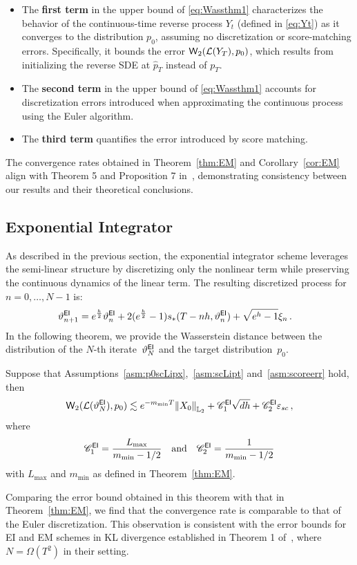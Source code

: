 \documentclass[11pt]{article}
\def\Ltwo{\mathbb L_2}
\def\wass{{\sf W}}
\def\law{{\mathcal L}}
\def\l|{\left\lVert}
\def\r|{\right\rVert}
\begin{document}
\begin{itemize}
    \item The \textbf{first term} in the upper bound of \eqref{eq:Wassthm1} characterizes the behavior of the continuous-time reverse process $Y_t$ (defined in \eqref{eq:Yt}) as it converges to the distribution $p_0$, assuming no discretization or score-matching errors. Specifically, it bounds the error $\wass_2(\law(Y_T), p_0)$, which results from initializing the reverse SDE at $\hat{p}_T$ instead of $p_T$. 
    \item The \textbf{second term} in the upper bound of \eqref{eq:Wassthm1} accounts for discretization errors introduced when approximating the continuous process using the Euler algorithm.  
    \item The \textbf{third term} quantifies the error introduced by score matching.  
\end{itemize}
The convergence rates obtained in Theorem~\ref{thm:EM} and Corollary~\ref{cor:EM} align with Theorem 5 and Proposition 7 in~\cite{gao2023wasserstein}, demonstrating consistency between our results and their theoretical conclusions.


\subsection{Exponential Integrator}
As described in the previous section, the exponential integrator scheme leverages the semi-linear structure by discretizing only the nonlinear term while preserving the continuous dynamics of the linear term. 
The resulting discretized process for $n=0,\dots,N-1$ is:
\begin{align*}
\vartheta^{\sf EI}_{n+1}&=e^{\frac{h}{2}}\vartheta^{\sf EI}_{n}
+2(e^{\frac{h}{2}}-1)s_*(T-nh,\vartheta^{\sf EI}_n)+\sqrt{e^h-1}\xi_n\,.
\end{align*}
In the following theorem, we provide the Wasserstein distance between the distribution of the $N$-th iterate~$\vartheta_N^{\sf EI}$ and the target distribution~$p_0$.
\begin{theorem}
    \label{thm:EI}
    Suppose that Assumptions~\ref{asm:p0scLipx},~\ref{asm:scLipt} and~\ref{asm:scoreerr} hold, then
    \begin{align*}
        \wass_2(\law(\vartheta_N^{\sf EI}),p_0)\lesssim e^{-m_{\min}T}\l|X_0\r|_{\Ltwo}+\mathscr C_1^{\sf EI}\sqrt{dh}+\mathscr C_2^{\sf EI}\varepsilon_{sc}\,,
    \end{align*}
    where 
    \begin{align*}
     \mathscr C_1^{\sf EI}=\dfrac{L_{\max}}{m_{\min}-1/2}~~\text{ and }~~
     \mathscr C_2^{\sf EI}=\dfrac{1}{m_{\min}-1/2}
    \end{align*}
    with $L_{\max}$ and $m_{\min}$ as defined in Theorem~\ref{thm:EM}.
\end{theorem}
Comparing the error bound obtained in this theorem with that in Theorem~\ref{thm:EM}, we find that the convergence rate is comparable to that of the Euler discretization.
This observation is consistent with the error bounds for {\sf EI} and 
{\sf EM} schemes in KL divergence established in Theorem 1 of~\cite{chen2023improved}, where $N=\Omega(T^2)$ in their setting.
\end{document}
